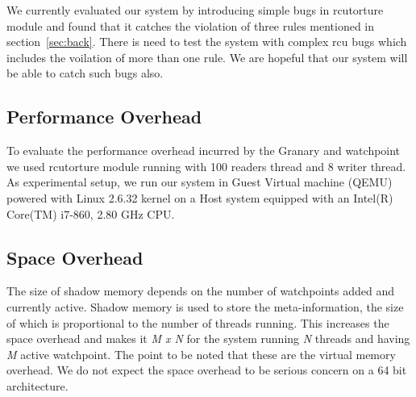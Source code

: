 We currently evaluated our system by introducing simple bugs in rcutorture module and found that it catches the violation of three rules mentioned in section~\ref{sec:back}. There is need to test the system with complex rcu bugs which includes the voilation of more than one rule. We are hopeful that our system will be able to catch such bugs also.

\subsection{Performance Overhead}
To evaluate the performance overhead incurred by the Granary and watchpoint we used rcutorture module running with 100 readers thread and 8 writer thread. As experimental setup, we run our system in Guest Virtual machine (QEMU) powered with Linux 2.6.32 kernel on a Host system equipped with an Intel(R) Core(TM) i7-860, 2.80 GHz CPU.

\subsection{Space Overhead}
The size of shadow memory depends on the number of watchpoints added and currently active. Shadow memory is used to store the meta-information, the size of which is proportional to the number of threads running. This increases the space overhead and makes it \emph{M x N} for the system running \emph{N} threads and having \emph{M} active watchpoint. The point to be noted that these are the virtual memory overhead. We do not expect the space overhead to be serious concern on a 64 bit architecture.    

